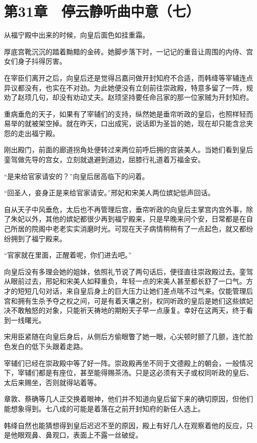 \section{第31章　停云静听曲中意（七）}

从福宁殿中出来的时候，向皇后面色如挂重霜。

厚底宫靴沉沉的踏着黝黯的金砖。她脚步落下时，一记记的重音让周围的内侍、宫女们身子抖得厉害。

在宰臣们离开之后，向皇后还是觉得吕嘉问做开封知府不合适，而韩绛等宰辅连点异议都没有，也实在不对劲。为此她便没有立刻前往崇政殿，特意多留了一阵，规劝了赵顼几句，却没有劝动丈夫。赵顼坚持要任命吕家的那一位家贼为开封知府。

重病垂危的天子，如果有了宰辅们的支持，纵然她是垂帘听政的皇后，也照样轻而易举的就被架空掉。就在昨天，口出成宪，说话即为圣旨的她，现在却只能含忿夹怨的走出福宁殿。

刚出殿门，前面的廊道拐角处便转过来两位前呼后拥的宫装美人。当她们看到皇后銮驾做先导的宫女，立刻就退避到道边，屈膝行礼道着万福金安。

“是来给官家请安的？”向皇后居高临下的问着。

“回圣人，妾身正是来给官家请安。”邢妃和宋美人两位嫔妃低声回话。

自从天子中风垂危，太后也不再管理后宫，垂帘听政的向皇后主掌宫内宫外事，除了朱妃以外，其他的嫔妃都很少再到福宁殿来，只是早晚来问个安，日常都是在自己所居的院阁中老老实实消磨时光。可现在天子病情稍稍有了一点起色，就又都纷纷拥到了福宁殿来。

“官家就在里面，正醒着呢，你们进去吧。”

向皇后没有多理会她的姐妹，依照礼节说了两句话后，便径直往崇政殿过去。銮驾从眼前过去，邢妃和宋美人如释重负，年轻一点的宋美人甚至都长舒了一口气。方才的短短几句对话，来自皇后身上的巨大压力让她们差点喘不过气来。仅能管理后宫和拥有生杀予夺之权之间，可是有着天壤之别，权同听政的皇后是她们这些嫔妃决不敢触怒的对象，只能祈天祷地的期盼天子早一点康复。幸好在这两天，终于看到一线曙光。

宋用臣紧随在向皇后身后，从侧后方偷眼瞥了她一眼，心尖顿时颤了几颤，连忙脸色发白的低下头跟着走路。

宰辅们已经在崇政殿中等了好一阵。崇政殿再坐不同于文德殿上的朝会，一般情况下，宰辅们都是有座位，甚至能得赐茶汤。只是这必须有天子或权同听政的皇后、太后来赐坐，否则就得站着等。

章敦、蔡确等几人正交换着眼神，他们并不知道向皇后留下来的确切原因，但他们能想象得到。七八成的可能是着落在之前开封知府的新任人选上。

韩绛自然也能猜想得到皇后迟迟不至的原因，殿上有好几人在观察着他的反应，只是他眼观鼻、鼻观口，表面上不露一丝破绽。

